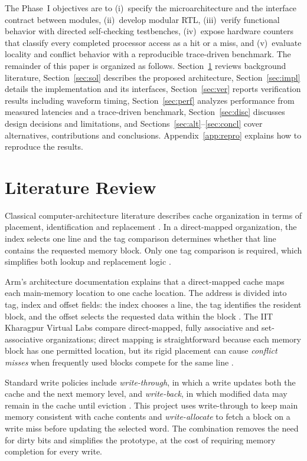 \documentclass[conference,a4paper]{IEEEtran}
\begin{document}
The Phase~I objectives are to (i)~specify the microarchitecture and the interface contract between modules, (ii)~develop modular RTL, (iii)~verify functional behavior with directed self-checking testbenches, (iv)~expose hardware counters that classify every completed processor access as a hit or a miss, and (v)~evaluate locality and conflict behavior with a reproducible trace-driven benchmark. The remainder of this paper is organized as follows. Section~\ref{sec:lit} reviews background literature, Section~\ref{sec:sol} describes the proposed architecture, Section~\ref{sec:impl} details the implementation and its interfaces, Section~\ref{sec:ver} reports verification results including waveform timing, Section~\ref{sec:perf} analyzes performance from measured latencies and a trace-driven benchmark, Section~\ref{sec:disc} discusses design decisions and limitations, and Sections~\ref{sec:alt}--\ref{sec:concl} cover alternatives, contributions and conclusions. Appendix~\ref{app:repro} explains how to reproduce the results.

\section{Literature Review}\label{sec:lit}
Classical computer-architecture literature describes cache organization in terms of placement, identification and replacement \cite{patterson,hennessy}. In a direct-mapped organization, the index selects one line and the tag comparison determines whether that line contains the requested memory block. Only one tag comparison is required, which simplifies both lookup and replacement logic \cite{patterson}.

Arm's architecture documentation explains that a direct-mapped cache maps each main-memory location to one cache location. The address is divided into tag, index and offset fields: the index chooses a line, the tag identifies the resident block, and the offset selects the requested data within the block \cite{arm}. The IIT Kharagpur Virtual Labs compare direct-mapped, fully associative and set-associative organizations; direct mapping is straightforward because each memory block has one permitted location, but its rigid placement can cause \emph{conflict misses} when frequently used blocks compete for the same line \cite{iitkgp}.

Standard write policies include \emph{write-through}, in which a write updates both the cache and the next memory level, and \emph{write-back}, in which modified data may remain in the cache until eviction \cite{hennessy}. This project uses write-through to keep main memory consistent with cache contents and \emph{write-allocate} to fetch a block on a write miss before updating the selected word. The combination removes the need for dirty bits and simplifies the prototype, at the cost of requiring memory completion for every write.
\end{document}
